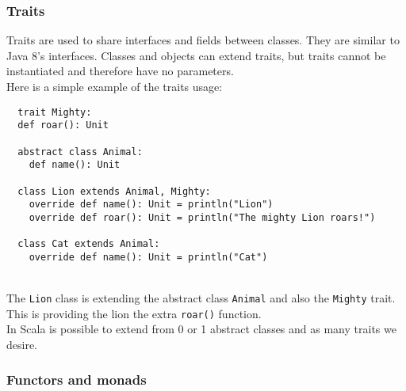 \subsubsection{Traits}
Traits are used to share interfaces and fields between classes. They are similar to Java 8’s interfaces.
Classes and objects can extend traits, but traits cannot be instantiated and therefore have no parameters.\\
Here is a simple example of the traits usage:
\begin{verbatim}
  trait Mighty:
  def roar(): Unit

  abstract class Animal:
    def name(): Unit

  class Lion extends Animal, Mighty:
    override def name(): Unit = println("Lion")
    override def roar(): Unit = println("The mighty Lion roars!")

  class Cat extends Animal:
    override def name(): Unit = println("Cat")
\end{verbatim}\mbox{}\\
The \texttt{Lion} class is extending the abstract class \texttt{Animal} and also the \texttt{Mighty} trait.
This is providing the lion the extra \texttt{roar()} function.\\
In Scala is possible to extend from 0 or 1 abstract classes and as many traits we desire.


\subsubsection{Functors and monads}
\label{sssec:functors-monads}

